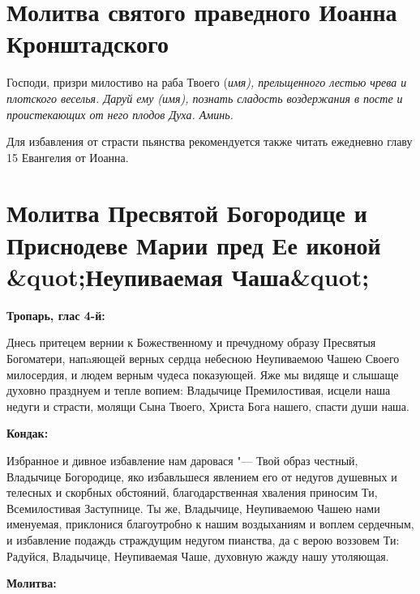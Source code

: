\section{Молитва святого праведного Иоанна Кронштадского}
 


Господи, призри милостиво на раба Твоего (\itshape имя\normalfont{}), прельщенного лестью чрева и плотского веселья. Даруй ему (\itshape имя\normalfont{}), познать сладость воздержания в посте и проистекающих от него плодов Духа. Аминь.

\itshape 

Для избавления от страсти пьянства рекомендуется также читать ежедневно главу 15 Евангелия от Иоанна.\normalfont{}


\section{Молитва Пресвятой Богородице и Приснодеве Марии пред  Ее иконой &quot;Неупиваемая Чаша&quot;}
 


\bfseries Тропарь, глас 4-й:\normalfont{}


Днесь притецем вернии к Божественному и пречудному образу Пресвятыя Богоматери, напaяющей верных сердца небесною Неупиваемою Чашею Своего милосердия, и людем верным чудеса показующей. Яже мы видяще и слышаще духовно празднуем и тепле вопием: Владычице Премилостивая, исцели наша недуги и страсти, молящи Сына Твоего, Христа Бога нашего, спасти души наша.


\medskip


\bfseries Кондак:\normalfont{}


Избранное и дивное избавление нам даровася "--- Твой образ честный, Владычице Богородице, яко избавльшеся явлением его от недугов душевных и телесных и скорбных обстояний, благодарственная хваления приносим Ти, Всемилостивая Заступнице. Ты же, Владычице, Неупиваемою Чашею нами именуемая, приклонися благоутробно к нашим воздыханиям и воплем сердечным, и избавление подаждь страждущим недугом пианства, да с верою воззовем Ти: Радуйся, Владычице, Неупиваемая Чаше, духовную жажду нашу утоляющая.


\medskip


\bfseries Молитва:\normalfont{}


